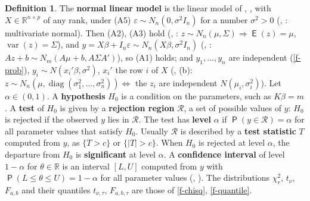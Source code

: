 \documentclass[12pt]{article}
\newcommand{\R}{\mathbb R}
\DeclareMathOperator{\diag}{diag}
\DeclareMathOperator\prb{\mathsf{P}}
\DeclareMathOperator\expc{\mathsf{E}}
\DeclareMathOperator\var{var}
\theoremstyle{definition}
\newtheorem{definition}[theorem]{Definition}
\begin{document}
\begin{definition}\label{h-def-normal}
The \textbf{normal linear model} is the linear model of , , with \(X\in\R^{n\times p}\) of any rank,
under (A5) \(\varepsilon\sim N_n(0,\sigma^2I_n)\) for a number \(\sigma^2>0\) (, : multivariate
normal). Then (A2), (A3) hold (, :
\(z\sim N_n(\mu,\Sigma)\Rightarrow\expc(z)=\mu\), \(\var(z)=\Sigma\)), and \(y=X\beta+I_n\varepsilon\sim
N_n(X\beta,\sigma^2I_n)\) (, : \(Az+b\sim N_m(A\mu+b,A\Sigma A')\)), so (A1) holds; and
\(y_1,\dots,y_n\) are independent (\ref{f-prob}), \(y_i\sim N(x_i'\beta,\sigma^2)\), \(x_i'\) the row \(i\) of \(X\)
(, (b): \(z\sim N_n(\mu,\diag(\sigma_1^2,\dots,\sigma_n^2))\iff\) the \(z_i\) are independent
\(N(\mu_i,\sigma_i^2)\)). Let \(\alpha\in(0,1)\). A \textbf{hypothesis} \(H_0\) is a condition on the parameters, such as
\(K\beta=m\). A \textbf{test} of \(H_0\) is given by a \textbf{rejection region} \(\mathcal R\), a set of possible values
of \(y\): \(H_0\) is rejected if the observed \(y\) lies in \(\mathcal R\). The test has \textbf{level} \(\alpha\) if
\(\prb(y\in\mathcal R)=\alpha\) for all parameter values that satisfy \(H_0\). Usually \(\mathcal R\) is described by a
\textbf{test statistic} \(T\) computed from \(y\), as \(\{T>c\}\) or \(\{\lvert T\rvert>c\}\). When \(H_0\) is rejected at
level \(\alpha\), the departure from \(H_0\) is \textbf{significant} at level \(\alpha\). A \textbf{confidence interval}
of level \(1-\alpha\) for \(\theta\in\R\) is an interval \([L,U]\) computed from \(y\) with
\(\prb(L\leqslant\theta\leqslant U)=1-\alpha\) for all parameter values (, ). The distributions
\(\chi^2_r\), \(t_\nu\), \(F_{a,b}\) and their quantiles \(t_{\nu,\tau}\), \(F_{a,b,\tau}\) are those of \ref{f-chisq},
\ref{f-quantile}.
\end{definition}
\end{document}

